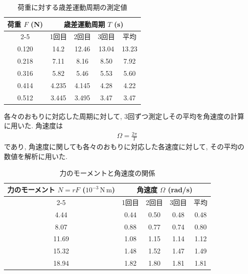 \documentclass{jlreq}
\begin{document}
\begin{table}[htbp]
  \centering
  \caption{荷重に対する歳差運動周期の測定値}
  \label{tab:load_period}
  \begin{tabular}{|c|c|c|c|c|}
    \hline
    \multirow{2}{*}{荷重 $F$ (N)} & \multicolumn{4}{c|}{歳差運動周期 $T$ (s)} \\ \cline{2-5}
                                  & 1回目 & 2回目 & 3回目 & 平均 \\ \hline
    0.120 & 14.2  & 12.46 & 13.04 & 13.23 \\ \hline
    0.218 & 7.11  & 8.16  & 8.50 & 7.92  \\ \hline
    0.316 & 5.82  & 5.46  & 5.53 & 5.60  \\ \hline
    0.414 & 4.235 & 4.145 & 4.28 & 4.22  \\ \hline
    0.512 & 3.445 & 3.495 & 3.47 & 3.47  \\ \hline
  \end{tabular}
\end{table}

各々のおもりに対応した周期に対して, 
3回ずつ測定しその平均を角速度の計算に用いた.
角速度は
\begin{align}
    \Omega = \frac{2\pi}{T}
\end{align}
であり, 角速度に関しても各々のおもりに対応した各速度に対して, 
その平均の数値を解析に用いた. 





\begin{table}[htbp]
  \centering
  \caption{力のモーメントと角速度の関係}
  \label{tab:moment_omega}
  \begin{tabular}{|c|c|c|c|c|}
    \hline
    \multirow{2}{*}{力のモーメント $N=rF$ ($10^{-3}\,\mathrm{N\,m}$)} &
      \multicolumn{4}{c|}{角速度 $\Omega$ (rad/s)} \\ \cline{2-5}
      & 1回目 & 2回目 & 3回目 & 平均 \\ \hline
    4.44  & 0.44 & 0.50 & 0.48 & 0.48 \\ \hline
    8.07  & 0.88 & 0.77 & 0.74 & 0.80 \\ \hline
    11.69 & 1.08 & 1.15 & 1.14 & 1.12 \\ \hline
    15.32 & 1.48 & 1.52 & 1.47 & 1.49 \\ \hline
    18.94 & 1.82 & 1.80 & 1.81 & 1.81 \\ \hline
  \end{tabular}
\end{table}
\end{document}
